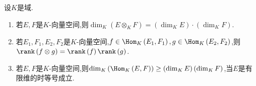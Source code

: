 \begin{remark}{}{}
	设$K$是域.
	\begin{enumerate}
		\item 若$E,F$是$K$-向量空间,则$\dim_{K}\left(E\otimes_{K}F\right)=\left(\dim_{K}E\right)\cdot\left(\dim_{K}F\right)$.
		\item 若$E_{1},F_{1},E_{2},F_{2}$是$K$-向量空间,$f\in\Hom_{K}\left(E_{1},F_{1}\right),g\in\Hom_{K}\left(E_{2},F_{2}\right)$,则$\rank\left(f\otimes g\right)=\rank\left(f\right)\rank\left(g\right)$.
		\item 若$E,F$是$K$-向量空间,则$\dim_{K}\left(\Hom_{K}\left(E,F\right)\right)\geq\left(\dim_{K}E\right)\left(\dim_{K}F\right)$,当$E$是有限维的时等号成立.
	\end{enumerate}
\end{remark}







































